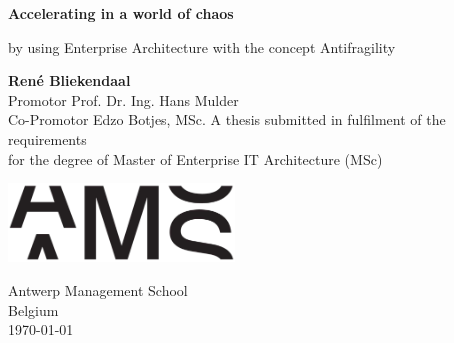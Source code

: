 \begin{titlepage}
	\begin{center}
		\vspace*{1cm}
		
		\Huge
		\textbf{Accelerating in a world of chaos}
		
		\vspace{0.5cm}
		\large
		
		by using Enterprise Architecture with the concept Antifragility
		
		\vspace{1.5cm}
		\Large
		\textbf{René Bliekendaal}\\
		\vspace{0.8cm}
		Promotor Prof. Dr. Ing. Hans Mulder\\
		Co-Promotor Edzo Botjes, MSc.		
		\vfill
		\large
		A thesis submitted in fulfilment of the requirements\\
		for the degree of Master of Enterprise IT Architecture (MSc)
		
		\vspace{0.8cm}
	
			\includegraphics[width=6cm]{images/ams-logo}
		
		\vspace{0.8cm}
		
		\Large
		Antwerp Management School\\
		Belgium\\
		\today
	\end{center}
\end{titlepage}